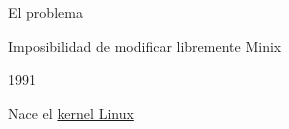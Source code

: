 \documentclass[hyperref={colorlinks}]{beamer}
\begin{document}
\begin{frame}
\begin{minipage}{.55\linewidth}
\begin{block}{El problema}
\begin{itemize}
                    \begin{minipage}{.8\linewidth} Imposibilidad de modificar libremente Minix \end{minipage}
                    \pause
            \end{itemize}
        \end{block}
    \begin{block}{1991}
        \begin{minipage}{.2\linewidth}
        \end{minipage}
        \begin{minipage}{.75\linewidth}
        Nace el \href{https://www.kernel.org/}{kernel Linux}
        \end{minipage}
    \end{block}
    \end{minipage}
\end{frame}
\end{document}
